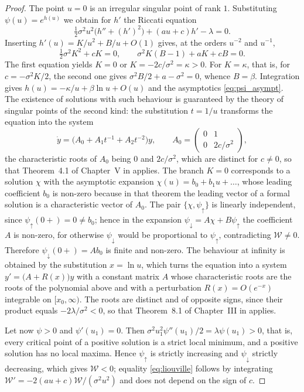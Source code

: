 \documentclass[smallextended]{svjour3}
\newcommand{\pup}{\psi_{\uparrow}}
\newcommand{\pdn}{\psi_{\downarrow}}
\begin{document}
\begin{proof}
The point $u=0$ is an irregular singular point of rank $1$. Substituting
$\psi(u)=e^{h(u)}$ we obtain for $h'$ the Riccati equation
$$
\tfrac12\sigma^2u^2\bigl(h''+(h')^2\bigr)+(au+c)h'-\lambda=0 .
$$
Inserting $h'(u)=K/u^2+B/u+O(1)$ gives, at the orders $u^{-2}$ and $u^{-1}$,
$$
\tfrac12\sigma^2K^2+cK=0,\qquad \sigma^2K(B-1)+aK+cB=0 .
$$
The first equation yields $K=0$ or $K=-2c/\sigma^2=\kappa>0$. For $K=\kappa$,
that is, for $c=-\sigma^2K/2$, the second one gives
$\sigma^2B/2+a-\sigma^2=0$, whence $B=\beta$. Integration gives
$h(u)=-\kappa/u+\beta\ln u+O(u)$ and the asymptotics \eqref{eq:psi_asympt}. The
existence of solutions with such behaviour is guaranteed by the theory of
singular points of the second kind: the substitution $t=1/u$ transforms the
equation into the system
$$
    \dot y=\bigl(A_0+A_1t^{-1}+A_2t^{-2}\bigr)y ,
    \qquad
    A_0=\begin{pmatrix} 0 & 1\\ 0 & 2c/\sigma^2\end{pmatrix} ,
$$
the characteristic roots of $A_0$ being $0$ and $2c/\sigma^2$, which are
distinct for $c\ne0$, so that Theorem~4.1 of Chapter~V in \cite{Coddington}
applies. The branch $K=0$ corresponds to a solution $\chi$ with the asymptotic
expansion $\chi(u)=b_0+b_1u+\dots$, whose leading coefficient $b_0$ is non-zero
because in that theorem the leading vector of a formal solution is a
characteristic vector of $A_0$. The pair $\{\chi,\pup\}$ is linearly
independent, since $\pup(0+)=0\ne b_0$; hence in the expansion
$\pdn=A\chi+B\pup$ the coefficient $A$ is non-zero, for otherwise $\pdn$ would
be proportional to $\pup$, contradicting $\mathcal W\ne0$. Therefore
$\pdn(0+)=Ab_0$ is finite and non-zero. The behaviour at infinity is obtained
by the substitution $x=\ln u$, which turns the equation into a system
$y'=\bigl(A+R(x)\bigr)y$ with a constant matrix $A$ whose characteristic roots
are the roots of the polynomial above and with a perturbation $R(x)=O(e^{-x})$
integrable on $[x_0,\infty)$. The roots are distinct and of opposite signs,
since their product equals $-2\lambda/\sigma^2<0$, so that Theorem~8.1 of
Chapter~III in \cite{Coddington} applies.

Let now $\psi>0$ and $\psi'(u_1)=0$. Then
$\sigma^2u_1^2\psi''(u_1)/2=\lambda\psi(u_1)>0$, that is, every critical point
of a positive solution is a strict local minimum, and a positive solution has
no local maxima. Hence $\pup$ is strictly increasing and $\pdn$ strictly
decreasing, which gives $\mathcal W<0$; equality \eqref{eq:liouville} follows
by integrating $\mathcal W'=-2(au+c)\mathcal W/(\sigma^2u^2)$ and does not
depend on the sign of $c$.


\end{proof}
\end{document}
